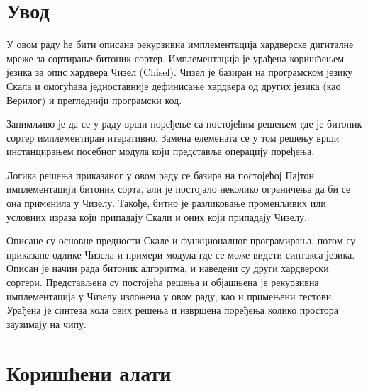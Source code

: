 \documentclass[12pt, a4paper]{article}
\theoremstyle{definition}
\begin{document}
\tableofcontents
\newpage

\section{Увод}
У овом раду ће бити описана рекурзивна имплементација хардверске дигиталне мреже за сортирање битоник сортер. Имплементација је урађена коришћењем језика за опис хардвера Чизел (Chisel). Чизел је базиран на програмском језику Скала и омогућава једноставније дефинисање хардвера од других језика (као Верилог) и прегледнији програмски код.

Занимљиво је да се у раду врши поређење са постојећим решењем где је битоник сортер имплементиран итеративно. Замена елемената се у том решењу врши инстанцирањем посебног модула који представља операцију поређења.

Логика решења приказаног у овом раду се базира на постојећој Пајтон имплементацији битоник сорта, али је постојало неколико ограничења да би се она применила у Чизелу. Такође, битно је разликовање променљивих или условних израза који припадају Скали и оних који припадају Чизелу.

Описане су основне предности Скале и функционалног програмирања, потом су приказане одлике Чизела и примери модула где се може видети синтакса језика. Описан је начин рада битоник алгоритма, и наведени су други хардверски сортери.
Представљена су постојећа решења и објашњена је рекурзивна имплементација у Чизелу изложена у овом раду, као и примењени тестови. Урађена је синтеза кола ових решења и извршена поређења колико простора заузимају на чипу.



\newpage

\section{Коришћени алати}
\end{document}

